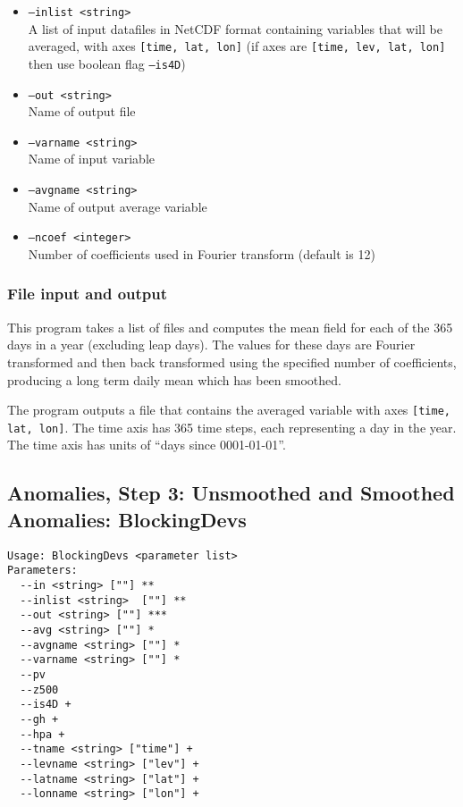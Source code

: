 \documentclass{article}
\begin{document}
\begin{itemize}
\item[]\texttt{--inlist <string>} \\ A list of input datafiles in NetCDF format containing variables that will be averaged, with axes \texttt{[time, lat, lon]} (if axes are \texttt{[time, lev, lat, lon] } then use boolean flag \texttt{--is4D})
\item[]\texttt{--out <string>} \\ Name of output file
\item[]\texttt{--varname <string>} \\ Name of input variable
\item[]\texttt{--avgname <string>} \\ Name of output average variable
\item[]\texttt{--ncoef <integer>} \\ Number of coefficients used in Fourier transform (default is 12)
\end{itemize}

\subsubsection{File input and output}
This program takes a list of files and computes the mean field for each of the 365 days in a year (excluding leap days). The values for these days are Fourier transformed and then back transformed using the specified number of coefficients, producing a long term daily mean which has been smoothed.

The program outputs a file that contains the averaged variable with axes \texttt{[time, lat, lon]}. The time axis has 365 time steps, each representing a day in the year. The time axis has units of ``days since 0001-01-01''.

\subsection{Anomalies, Step 3: Unsmoothed and Smoothed Anomalies: BlockingDevs}\label{dev}
\begin{verbatim}
Usage: BlockingDevs <parameter list>
Parameters:
  --in <string> [""] **
  --inlist <string>  [""] **
  --out <string> [""] ***
  --avg <string> [""] *
  --avgname <string> [""] *
  --varname <string> [""] *
  --pv
  --z500
  --is4D +
  --gh +
  --hpa +
  --tname <string> ["time"] +
  --levname <string> ["lev"] +
  --latname <string> ["lat"] +
  --lonname <string> ["lon"] +
\end{verbatim}
\end{document}
